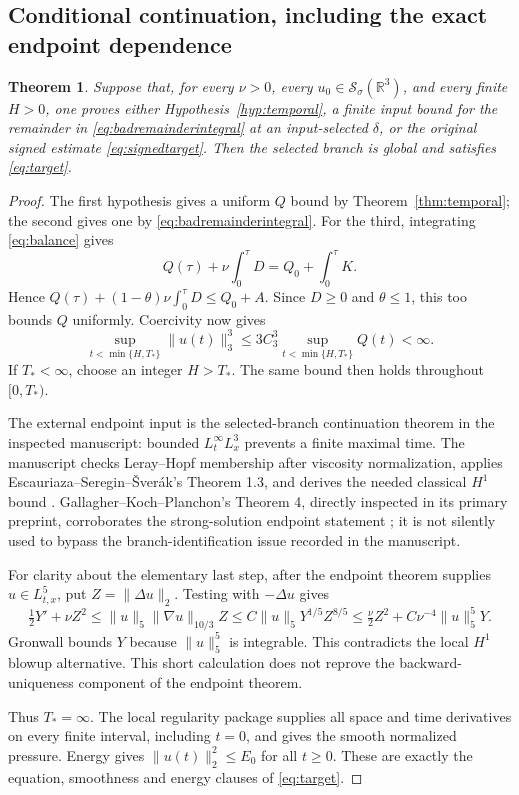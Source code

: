 \documentclass[11pt,a4paper]{article}
\newtheorem{theorem}{Theorem}[section]
\theoremstyle{definition}\newtheorem{definition}[theorem]{Definition}
\theoremstyle{remark}\newtheorem{remark}[theorem]{Remark}
\newcommand{\R}{\mathbb R}
\newcommand{\norm}[1]{\lVert #1\rVert}
\newcommand{\Sch}{\mathcal S_\sigma(\R^3)}
\numberwithin{equation}{section}
\begin{document}
\subsection{Conditional continuation, including the exact endpoint dependence}
\begin{theorem}\label{thm:fullconditional}
Suppose that, for every $\nu>0$, every $u_0\in\Sch$, and every finite $H>0$, one proves either Hypothesis~\ref{hyp:temporal}, a finite input bound for the remainder in \eqref{eq:badremainderintegral} at an input-selected $\delta$, or the original signed estimate \eqref{eq:signedtarget}. Then the selected branch is global and satisfies \eqref{eq:target}.
\end{theorem}
\begin{proof}
The first hypothesis gives a uniform $Q$ bound by Theorem~\ref{thm:temporal}; the second gives one by \eqref{eq:badremainderintegral}. For the third, integrating \eqref{eq:balance} gives
\[
 Q(\tau)+\nu\int_0^\tau D=Q_0+\int_0^\tau K.
\]
Hence $Q(\tau)+(1-\theta)\nu\int_0^\tau D\le Q_0+A$. Since $D\ge0$ and $\theta\le1$, this too bounds $Q$ uniformly. Coercivity now gives
\[
 \sup_{t<\min\{H,T_*\}}\norm{u(t)}_3^3
 \le3C_3^3\sup_{t<\min\{H,T_*\}}Q(t)<\infty.
\]
If $T_*<\infty$, choose an integer $H>T_*$. The same bound then holds throughout $[0,T_*)$.

The external endpoint input is the selected-branch continuation theorem in the inspected manuscript: bounded $L^\infty_tL^3_x$ prevents a finite maximal time. The manuscript checks Leray--Hopf membership after viscosity normalization, applies Escauriaza--Seregin--\v Sver\'ak's Theorem 1.3, and derives the needed classical $H^1$ bound \cite{ESS,Paper}. Gallagher--Koch--Planchon's Theorem 4, directly inspected in its primary preprint, corroborates the strong-solution endpoint statement \cite{GKP}; it is not silently used to bypass the branch-identification issue recorded in the manuscript.

For clarity about the elementary last step, after the endpoint theorem supplies $u\in L^5_{t,x}$, put $Z=\norm{\Delta u}_2$. Testing with $-\Delta u$ gives
\[
 \tfrac12Y'+\nu Z^2
 \le\norm u_5\norm{\nabla u}_{10/3}Z
 \le C\norm u_5Y^{1/5}Z^{8/5}
 \le\tfrac\nu2Z^2+C\nu^{-4}\norm u_5^5Y.
\]
Gronwall bounds $Y$ because $\norm u_5^5$ is integrable. This contradicts the local $H^1$ blowup alternative. This short calculation does not reprove the backward-uniqueness component of the endpoint theorem.

Thus $T_*=\infty$. The local regularity package supplies all space and time derivatives on every finite interval, including $t=0$, and gives the smooth normalized pressure. Energy gives $\norm{u(t)}_2^2\le E_0$ for all $t\ge0$. These are exactly the equation, smoothness and energy clauses of \eqref{eq:target}.
\end{proof}
\end{document}
